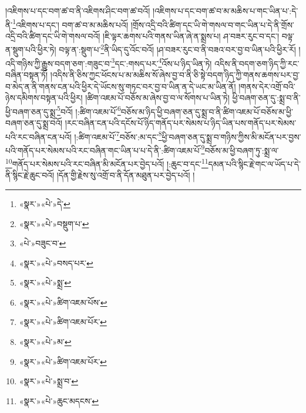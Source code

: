 །འཇིགས་པ་དང་བག་ཚ་བ་ནི་འཇིགས་ཤིང་བག་ཚ་བའོ། །འཇིགས་པ་དང་བག་ཚ་བ་མ་མཆིས་པ་གང་ཡིན་པ་:དེ་ནི་\footnote{«སྣར་»«པེ་»དེ་}འཇིགས་པ་དང་། བག་ཚ་བ་མ་མཆིས་པའོ། །གྲོས་འདྲི་བའི་ཚིག་དང་ཡི་གེ་གསལ་བ་གང་ཡིན་པ་དེ་ནི་གྲོས་འདྲི་བའི་ཚིག་དང་ཡི་གེ་གསལ་བའོ། །ཇི་ལྟར་ཆགས་པའི་གནས་ཡིན་ཞེ་ན་སྨྲས་པ། ཤ་བཟར་རུང་བ་དང་། བལྟ་ན་སྡུག་པའི་ཕྱིར་ཏེ། བལྟ་ན་:སྡུག་པ་\footnote{«སྣར་»«པེ་»བསྡུག་པ་}ནི་ཡིད་དུ་འོང་བའོ། །ཤ་བཟར་རུང་བ་ནི་བཟའ་བར་བྱ་བ་ཡིན་པའི་ཕྱིར་རོ། །འདི་གཉིས་ཀྱི་རྒྱུས་བདག་ཅག་:གཟུང་བ་\footnote{«པེ་»བཟུང་བ་}དང་:གསད་པར་\footnote{«སྣར་»«པེ་»བསད་པར་}འོས་པ་ཉིད་ཡིན་ཏེ། འདིས་ནི་བདག་ཅག་ཉིད་ཀྱི་རང་བཞིན་བསྟན་ཏོ། །འདིས་ནི་ཅིས་ཀྱང་ཕོངས་པ་མ་མཆིས་སོ་ཞེས་བྱ་བ་ནི་ཅི་སྟེ་བདག་ཉིད་ཀྱི་གནས་ཆགས་པར་བྱ་བ་མེད་ན་ནི་གནས་ངན་པའི་ཕྱིར་དེ་ཡོངས་སུ་གཏང་བར་བྱ་བ་ཡིན་ན་དེ་ཡང་མ་ཡིན་ནོ། །གནས་དེར་འགྲོ་བའི་ཉེས་དམིགས་བསྟན་པའི་ཕྱིར། །ཚིག་འཇམ་པོ་བཅོས་མ་ཞེས་བྱ་བ་ལ་སོགས་པ་ཡིན་ཏེ། ཕྱི་བཞག་ཅན་དུ་:སྨྲ་བ་ནི་ཕྱི་བཞག་ཅན་དུ་སྨྲ་\footnote{«སྣར་»«པེ་»སྨྲ་}བའོ། །:ཚིག་འཇམ་པོ་\footnote{«སྣར་»«པེ་»ཚིག་འཇམ་པོས་}བཅོས་མ་ཉིད་ཕྱི་བཞག་ཅན་དུ་སྨྲ་བ་ནི་ཚིག་འཇམ་པོ་བཅོས་མ་ཕྱི་བཞག་ཅན་དུ་སྨྲ་བའོ། །རང་བཞིན་ངན་པའི་དངོས་པོ་ཉིད་གནོད་པར་སེམས་པ་ཉིད་ཡིན་པས་གནོད་པར་སེམས་པའི་རང་བཞིན་ངན་པའོ། །:ཚིག་འཇམ་པོ་\footnote{«སྣར་»«པེ་»ཚིག་འཇམ་པོར་}བཅོས་:མ་དང་\footnote{«སྣར་»«པེ་»མ་}ཕྱི་བཞག་ཅན་དུ་སྨྲ་བ་གཉིས་ཀྱིས་མི་མངོན་པར་བྱས་པའི་གནོད་པར་སེམས་པའི་རང་བཞིན་གང་ཡིན་པ་པ་དེ་ནི་:ཚིག་འཇམ་པོ་\footnote{«སྣར་»«པེ་»ཚིག་འཇམ་པོར་}བཅོས་མ་ཕྱི་བཞག་ཏུ་:སྨྲ་ལ་\footnote{«སྣར་»«པེ་»སྨྲ་བ་}གནོད་པར་སེམས་པའི་རང་བཞིན་མི་མངོན་པར་བྱེད་པའོ། །:ཆུང་བ་དང་\footnote{«སྣར་»«པེ་»ཆུང་མདངས་}དམན་པའི་སྙིང་རྗེ་གང་ལ་ཡོད་པ་དེ་ནི་སྙིང་རྗེ་ཆུང་བའོ། །དོན་གྱི་རྗེས་སུ་འགྲོ་བ་ནི་དོན་མཐུན་པར་བྱེད་པའོ། །
